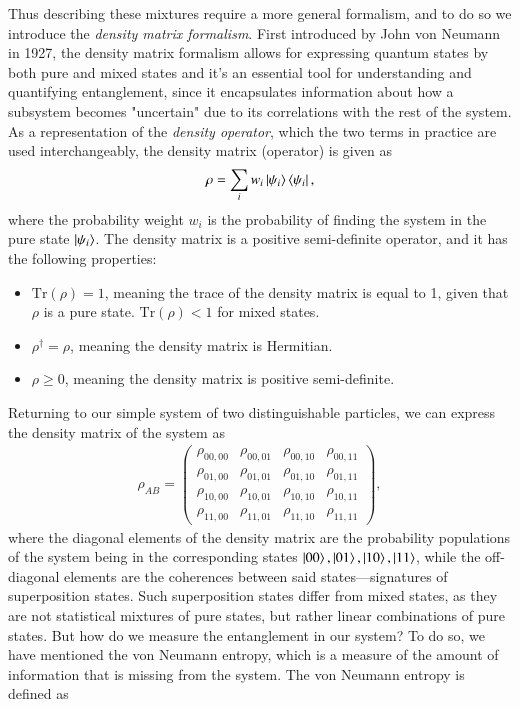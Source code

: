 \documentclass{subfiles}
\begin{document}
Thus describing these mixtures require a more general formalism, and to do so we introduce the \emph{density matrix formalism}. First introduced by John von Neumann in 1927\cite{neumann1927}, the density matrix formalism allows for expressing quantum states by both pure and mixed states and it's an essential tool for understanding and quantifying entanglement, since it encapsulates information about how a subsystem becomes "uncertain" due to its correlations with the rest of the system. As a representation of the \emph{density operator}, which the two terms in practice are used interchangeably, the density matrix (operator) is given as
\begin{equation}
    \rho = \sum_i w_i\ket{\psi_i}\bra{\psi_i}\label{eq:density_matrix},
\end{equation}
where the probability weight $w_i$ is the probability of finding the system in the pure state $\ket{\psi_i}$. The density matrix is a positive semi-definite operator, and it has the following properties:
\begin{itemize}
    \item $\text{Tr}(\rho) = 1$, meaning the trace of the density matrix is equal to 1, given that $\rho$ is a pure state. $\text{Tr}(\rho) < 1$ for mixed states.
    \item $\rho^\dagger = \rho$, meaning the density matrix is Hermitian.
    \item $\rho \geq 0$, meaning the density matrix is positive semi-definite.
\end{itemize}
Returning to our simple system of two distinguishable particles, we can express the density matrix of the system as
\begin{align*}
    \rho_{AB} = \begin{pmatrix}
        \rho_{00, 00} & \rho_{00, 01} & \rho_{00, 10} & \rho_{00, 11} \\
        \rho_{01, 00} & \rho_{01, 01} & \rho_{01, 10} & \rho_{01, 11} \\
        \rho_{10, 00} & \rho_{10, 01} & \rho_{10, 10} & \rho_{10, 11} \\
        \rho_{11, 00} & \rho_{11, 01} & \rho_{11, 10} & \rho_{11, 11}
    \end{pmatrix},
\end{align*}
where the diagonal elements of the density matrix are the probability populations of the system being in the corresponding states $\ket{00}, \ket{01}, \ket{10}, \ket{11}$, while the off-diagonal elements are the coherences between said states—signatures of superposition states. Such superposition states differ from mixed states, as they are not statistical mixtures of pure states, but rather linear combinations of pure states. But how do we measure the entanglement in our system? To do so, we have mentioned the von Neumann entropy, which is a measure of the amount of information that is missing from the system. The von Neumann entropy is defined as \cite{nielsen2010quantum}
\end{document}
